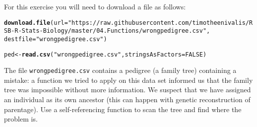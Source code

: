 \documentclass[12pt,a4paper]{scrartcl}\usepackage[]{graphicx}\usepackage[]{color}
\makeatletter
\newcommand{\hlnum}[1]{\textcolor[rgb]{0.686,0.059,0.569}{#1}}%
\newcommand{\hlstr}[1]{\textcolor[rgb]{0.192,0.494,0.8}{#1}}%
\newcommand{\hlstd}[1]{\textcolor[rgb]{0.345,0.345,0.345}{#1}}%
\newcommand{\hlkwb}[1]{\textcolor[rgb]{0.69,0.353,0.396}{#1}}%
\newcommand{\hlkwc}[1]{\textcolor[rgb]{0.333,0.667,0.333}{#1}}%
\newcommand{\hlkwd}[1]{\textcolor[rgb]{0.737,0.353,0.396}{\textbf{#1}}}%
\newenvironment{kframe}{%
 \def\at@end@of@kframe{}%
 \ifinner\ifhmode%
  \def\at@end@of@kframe{\end{minipage}}%
  \begin{minipage}{\columnwidth}%
 \fi\fi%
 \def\FrameCommand##1{\hskip\@totalleftmargin \hskip-\fboxsep
 \colorbox{shadecolor}{##1}\hskip-\fboxsep
     \hskip-\linewidth \hskip-\@totalleftmargin \hskip\columnwidth}%
 \MakeFramed {\advance\hsize-\width
   \@totalleftmargin\z@ \linewidth\hsize
   \@setminipage}}%
 {\par\unskip\endMakeFramed%
 \at@end@of@kframe}
\newenvironment{knitrout}{}{} %
\makeatother
\begin{document}
\begin{Exercise}[difficulty=3, title={Find a mistake in a family tree (Challenging!)}]
For this exercise you will need to download a file as follows: 
\begin{knitrout}
\color{fgcolor}\begin{kframe}
\begin{alltt}
\hlkwd{download.file}\hlstd{(}\hlkwc{url}\hlstd{=}\hlstr{"https://raw.githubusercontent.com/timotheenivalis/RSB-R-Stats-Biology/master/04.Functions/wrongpedigree.csv"}\hlstd{,}
\hlkwc{destfile} \hlstd{=} \hlstr{"wrongpedigree.csv"}\hlstd{)}

\hlstd{ped} \hlkwb{<-} \hlkwd{read.csv}\hlstd{(}\hlstr{"wrongpedigree.csv"}\hlstd{,} \hlkwc{stringsAsFactors} \hlstd{=} \hlnum{FALSE}\hlstd{)}
\end{alltt}
\end{kframe}
\end{knitrout}

The file \texttt{wrongpedigree.csv} contains a pedigree (a family tree) containing a mistake: a function we tried to apply on this data set informed us that the family tree was impossible without more information. We suspect that we have assigned an individual as its own ancestor (this can happen with genetic reconstruction of parentage). Use a self-referencing function to scan the tree and find where the problem is.
\end{Exercise}
\end{document}
